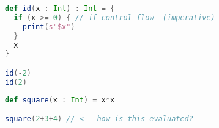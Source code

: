 \documentclass[10pt]{beamer}
\begin{document}
\begin{frame}[fragile]
\begin{lstlisting}[language=Scala, basicstyle=\ttfamily]
def id(x : Int) : Int = {
  if (x >= 0) { // if control flow  (imperative) 
    print(s"$x")
  }
  x
}

id(-2)
id(2)
\end{lstlisting}
\end{frame}


\begin{frame}[fragile]
\begin{lstlisting}[language=Scala, basicstyle=\ttfamily]
def square(x : Int) = x*x

square(2+3+4) // <-- how is this evaluated?
\end{lstlisting}
\end{frame}
\end{document}
